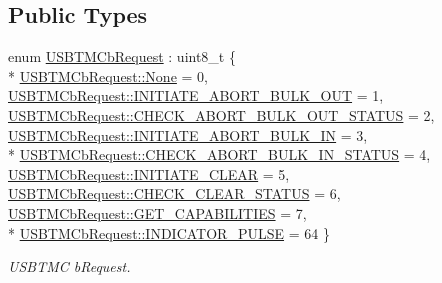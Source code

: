 \subsection*{Public Types}
\begin{DoxyCompactItemize}
\item 
enum \hyperlink{classmdt_usbtmc_control_transfer_a9f40cbd57464978b74624c66fa083251}{U\-S\-B\-T\-M\-Cb\-Request} \-: uint8\-\_\-t \{ \\*
\hyperlink{classmdt_usbtmc_control_transfer_a9f40cbd57464978b74624c66fa083251a6adf97f83acf6453d4a6a4b1070f3754}{U\-S\-B\-T\-M\-Cb\-Request\-::\-None} = 0, 
\hyperlink{classmdt_usbtmc_control_transfer_a9f40cbd57464978b74624c66fa083251a4b910f3c6efa4c00ab50c021d1bae17f}{U\-S\-B\-T\-M\-Cb\-Request\-::\-I\-N\-I\-T\-I\-A\-T\-E\-\_\-\-A\-B\-O\-R\-T\-\_\-\-B\-U\-L\-K\-\_\-\-O\-U\-T} = 1, 
\hyperlink{classmdt_usbtmc_control_transfer_a9f40cbd57464978b74624c66fa083251a8e725abe772f1ec8511ad20cd18d29dd}{U\-S\-B\-T\-M\-Cb\-Request\-::\-C\-H\-E\-C\-K\-\_\-\-A\-B\-O\-R\-T\-\_\-\-B\-U\-L\-K\-\_\-\-O\-U\-T\-\_\-\-S\-T\-A\-T\-U\-S} = 2, 
\hyperlink{classmdt_usbtmc_control_transfer_a9f40cbd57464978b74624c66fa083251a57834c39b68a91a648145b695e48d583}{U\-S\-B\-T\-M\-Cb\-Request\-::\-I\-N\-I\-T\-I\-A\-T\-E\-\_\-\-A\-B\-O\-R\-T\-\_\-\-B\-U\-L\-K\-\_\-\-I\-N} = 3, 
\\*
\hyperlink{classmdt_usbtmc_control_transfer_a9f40cbd57464978b74624c66fa083251ace3ca35d7227c086e77a76aab3c76d92}{U\-S\-B\-T\-M\-Cb\-Request\-::\-C\-H\-E\-C\-K\-\_\-\-A\-B\-O\-R\-T\-\_\-\-B\-U\-L\-K\-\_\-\-I\-N\-\_\-\-S\-T\-A\-T\-U\-S} = 4, 
\hyperlink{classmdt_usbtmc_control_transfer_a9f40cbd57464978b74624c66fa083251ad6f130330eaada1770d26d6906b1977b}{U\-S\-B\-T\-M\-Cb\-Request\-::\-I\-N\-I\-T\-I\-A\-T\-E\-\_\-\-C\-L\-E\-A\-R} = 5, 
\hyperlink{classmdt_usbtmc_control_transfer_a9f40cbd57464978b74624c66fa083251a34c6b8e885527e8b41b195d3fc18677a}{U\-S\-B\-T\-M\-Cb\-Request\-::\-C\-H\-E\-C\-K\-\_\-\-C\-L\-E\-A\-R\-\_\-\-S\-T\-A\-T\-U\-S} = 6, 
\hyperlink{classmdt_usbtmc_control_transfer_a9f40cbd57464978b74624c66fa083251ac5fdfd8898fb5bd8d1b9913c55be662a}{U\-S\-B\-T\-M\-Cb\-Request\-::\-G\-E\-T\-\_\-\-C\-A\-P\-A\-B\-I\-L\-I\-T\-I\-E\-S} = 7, 
\\*
\hyperlink{classmdt_usbtmc_control_transfer_a9f40cbd57464978b74624c66fa083251a6cc9be4b934a31774eba74dc9c234a1b}{U\-S\-B\-T\-M\-Cb\-Request\-::\-I\-N\-D\-I\-C\-A\-T\-O\-R\-\_\-\-P\-U\-L\-S\-E} = 64
 \}
\begin{DoxyCompactList}\small\item\em U\-S\-B\-T\-M\-C b\-Request. \end{DoxyCompactList}\item 

\end{DoxyCompactItemize}
